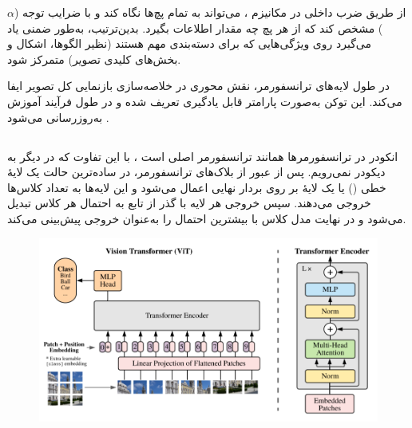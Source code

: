  از طریق ضرب داخلی در مکانیزم ، می‌تواند به تمام پچ‌ها نگاه کند و با ضرایب توجه (\(\alpha\)) مشخص کند که از هر پچ چه مقدار اطلاعات بگیرد. بدین‌ترتیب، به‌طور ضمنی یاد می‌گیرد روی ویژگی‌هایی که برای دسته‌بندی مهم هستند (نظیر الگوها، اشکال و بخش‌های کلیدی تصویر) متمرکز شود.

در طول لایه‌های ترانسفورمر،  نقش محوری در خلاصه‌سازی بازنمایی کل تصویر ایفا می‌کند. این توکن به‌صورت پارامتر قابل یادگیری تعریف شده و در طول فرآیند آموزش به‌روزرسانی می‌شود \cite{devlin2018bert,dosovitskiy2020image}.

\subsection{}

انکودر در ترانسفورمرها همانند ترانسفورمر اصلی است \cite{vaswani2017attention}، با این تفاوت که در  \cite{dosovitskiy2020image} دیگر به دیکودر نمی‌رویم. پس از عبور از بلاک‌های ترانسفورمر، در ساده‌ترین حالت یک لایهٔ خطی () یا یک لایهٔ  بر روی بردار نهایی اعمال می‌شود و این لایه‌ها به تعداد کلاس‌ها خروجی می‌دهند.  
سپس خروجی هر لایه با گذر از تابع  به احتمال هر کلاس تبدیل می‌شود و در نهایت مدل کلاس با بیشترین احتمال را به‌عنوان خروجی پیش‌بینی می‌کند.

\begin{figure}[h]
	\centering
	\begin{minipage}[b]{0.9\textwidth}
		\centering
		\includegraphics[width=\textwidth]{transformer_images/vision_transformer_after_embedding.png}
		\caption{}
		\label{fig:Cls Token In Vision Transformer}
	\end{minipage}
	\hfill
\end{figure}

